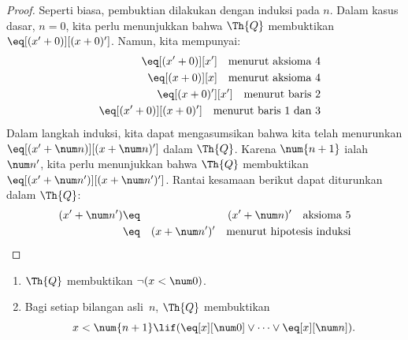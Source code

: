 \documentclass[../../../include/open-logic-section]{subfiles}
\begin{document}
\begin{proof}
Seperti biasa, pembuktian dilakukan dengan induksi pada $n$. Dalam kasus
dasar, $n = 0$, kita perlu menunjukkan bahwa $\Th{Q}$ membuktikan
$\eq[(x'+0)][(x+0)']$. Namun, kita mempunyai:
\begin{eqnarray*}
& & \eq[(x' + 0)][x'] \quad \text{menurut aksioma 4} \\
& & \eq[(x + 0)][x] \quad \text{menurut aksioma 4} \\
& & \eq[(x+0)'][x'] \quad \text{menurut baris 2} \\
& & \eq[(x' + 0)][(x + 0)'] \quad \text{menurut baris 1 dan 3}
\end{eqnarray*}
Dalam langkah induksi, kita dapat mengasumsikan bahwa kita telah menurunkan
$\eq[(x' + \num n)][(x + \num n)']$ dalam $\Th{Q}$. Karena $\num{n+1}$
ialah $\num n'$, kita perlu menunjukkan bahwa $\Th{Q}$ membuktikan
$\eq[(x' + \num n')][(x + \num n')']$. Rantai kesamaan berikut dapat
diturunkan dalam $\Th{Q}$:
\begin{eqnarray*}
(x' + \num n') & \eq & (x' + \num n)' \quad \text{aksioma 5} \\
& \eq & (x + \num n')' \quad \text{menurut hipotesis induksi}
\end{eqnarray*}
\end{proof}

\begin{lem}
\begin{enumerate}
\item $\Th{Q}$ membuktikan $\lnot (x < \num 0)$.
\item Bagi setiap bilangan asli~$n$, $\Th{Q}$ membuktikan
\[
x < \num {n+1} \lif (\eq[x][\num 0] \lor \dots \lor \eq[x][\num n]).
\]
\end{enumerate}
\end{lem}
\end{document}
